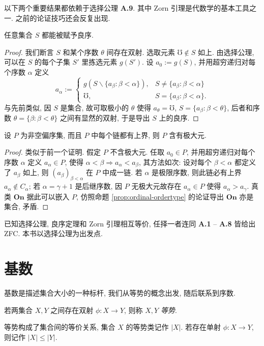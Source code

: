 以下两个重要结果都依赖于选择公理 \textbf{A.9}. 其中 Zorn 引理是代数学的基本工具之一. 之前的论证技巧还会反复出现.
\begin{theorem}\label{prop:wellorder-principle}
	任意集合 $S$ 都能被赋予良序.
\end{theorem}
\begin{proof}
	我们断言 $S$ 和某个序数 $\theta$ 间存在双射. 选取元素 $\mho \notin S$ 如上. 由选择公理, 可以在 $S$ 的每个子集 $S'$ 里拣选元素 $g(S')$. 设 $a_0 := g(S)$, 并用超穷递归对每个序数 $\alpha$ 定义
	\[ a_\alpha := \begin{cases}
		g \left( S \smallsetminus \{ a_\beta : \beta < \alpha \} \right), & S \neq \{ a_\beta : \beta < \alpha \} \\
		\mho, & S = \{ a_\beta : \beta < \alpha \}.
	\end{cases}\]
	与先前类似, 因 $S$ 是集合, 故可取极小的 $\theta$ 使得 $a_\theta = \mho$, $S = \{a_\beta: \beta < \theta\}$, 后者和序数 $\theta = \{\beta : \beta < \theta \}$ 之间有显然的双射, 于是导出 $S$ 上的良序.
\end{proof}

\begin{theorem}[Zorn 引理]\label{prop:Zorn}
	设 $P$ 为非空偏序集, 而且 $P$ 中每个链都有上界, 则 $P$ 含有极大元.
\end{theorem}
\begin{proof}
	类似于前一个证明. 假定 $P$ 不含极大元. 任取 $a_0 \in P$, 并用超穷递归对每个序数 $\alpha$ 定义 $a_\alpha \in P$, 使得 $\alpha < \beta \Rightarrow a_\alpha < a_\beta$, 其方法如次: 设对每个 $\beta < \alpha$ 都定义了 $a_\beta$ 如上, 则 $(a_\beta)_{\beta < \alpha}$ 在 $P$ 中成一链. 若 $\alpha$ 是极限序数, 则此链必有上界 $a_\alpha \notin C_\alpha$; 若 $\alpha = \gamma + 1$ 是后继序数, 因 $P$ 无极大元故存在 $a_\alpha \in P$ 使得 $a_\alpha > a_\gamma$. 真类 $\textbf{On}$ 据此可以嵌入 $P$, 仿照命题 \ref{prop:ordinal-ordertype} 的论证导出 $\textbf{On}$ 亦是集合, 矛盾.
\end{proof}
已知选择公理, 良序定理和 Zorn 引理相互等价, 任择一者连同 \textbf{A.1} -- \textbf{A.8} 皆给出 ZFC. 本书以选择公理为出发点.

\section{基数}\label{sec:cardinal-number}
基数是描述集合大小的一种标杆, 我们从等势的概念出发, 随后联系到序数.

\begin{definition}
	若两集合 $X, Y$ 之间存在双射 $\phi: X \to Y$, 则称 $X, Y$ \emph{等势}.

	等势构成了集合间的等价关系, 集合 $X$ 的等势类记作 $|X|$. 若存在单射 $\phi: X \to Y$, 则记作 $|X| \leq |Y|$.
\end{definition}

